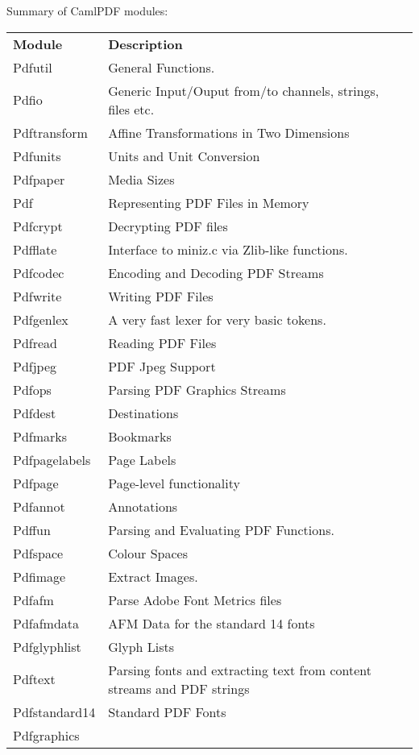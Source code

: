 \documentclass[a4paper]{memoir}
\newcommand{\smallgap}{\vspace{4mm}}
\begin{document}
\smallgap

\noindent Summary of \textsf{CamlPDF} modules:

\smallgap

{\centering\small
\begin{tabular}{lp{10cm}l}
  \textbf{Module} & \textbf{Description} \\
Pdfutil &
General Functions. & \\
Pdfio &
Generic Input/Ouput from/to channels, strings, files etc. & \\
Pdftransform &
Affine Transformations in Two Dimensions &  \\
Pdfunits &
Units and Unit Conversion & \\
Pdfpaper &
Media Sizes & \\
Pdf &
Representing PDF Files in Memory & \\
Pdfcrypt &
Decrypting PDF files & \\
Pdfflate &
Interface to miniz.c via Zlib-like functions. & \\
Pdfcodec &
Encoding and Decoding PDF Streams & \\
Pdfwrite &
Writing PDF Files & \\
Pdfgenlex &
A very fast lexer for very basic tokens. & \\
Pdfread &
Reading PDF Files & \\
Pdfjpeg &
PDF Jpeg Support & \\
Pdfops &
Parsing PDF Graphics Streams & \\
Pdfdest &
Destinations & \\
Pdfmarks &
Bookmarks & \\
Pdfpagelabels &
Page Labels & \\
Pdfpage &
Page-level functionality & \\
Pdfannot &
Annotations & \\
Pdffun &
Parsing and Evaluating PDF Functions. & \\
Pdfspace &
Colour Spaces & \\
Pdfimage &
Extract Images. & \\
Pdfafm &
Parse Adobe Font Metrics files & \\
Pdfafmdata &
AFM Data for the standard 14 fonts & \\ 
Pdfglyphlist &
Glyph Lists & \\
Pdftext &
Parsing fonts and extracting text from content streams and PDF strings & \\
Pdfstandard14 &
Standard PDF Fonts & \\
Pdfgraphics &

\end{tabular}}
\end{document}
